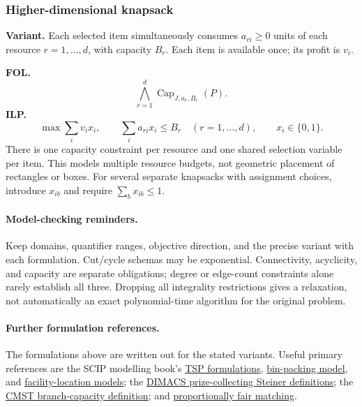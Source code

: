 \subsubsection{Higher-dimensional knapsack}\label{form:multiknapsack}
\textbf{Variant.} Each selected item simultaneously consumes $a_{ri}\ge0$
units of each resource $r=1,\ldots,d$, with capacity $B_r$. Each item is
available once; its profit is $v_i$.

\textbf{FOL.}
\[
 \bigwedge_{r=1}^d\operatorname{Cap}_{J,a_r,B_r}(P).
\]
\textbf{ILP.}
\[
 \max\sum_i v_ix_i,\qquad
 \sum_i a_{ri}x_i\le B_r\quad(r=1,\ldots,d),
 \qquad x_i\in\{0,1\}.
\]
There is one capacity constraint per resource and one shared selection
variable per item. This models multiple resource budgets, not geometric
placement of rectangles or boxes. For several separate knapsacks with
assignment choices, introduce $x_{ib}$ and require $\sum_bx_{ib}\le1$.

\paragraph{Model-checking reminders.}
Keep domains, quantifier ranges, objective direction, and the precise
variant with each formulation. Cut/cycle schemas may be exponential.
Connectivity, acyclicity, and capacity are separate obligations; degree or
edge-count constraints alone rarely establish all three. Dropping all
integrality restrictions gives a relaxation, not automatically an exact
polynomial-time algorithm for the original problem.

\paragraph{Further formulation references.}
The formulations above are written out for the stated variants. Useful
primary references are the SCIP modelling book's
\href{https://scipbook.readthedocs.io/en/latest/routing.html}{TSP formulations},
\href{https://github.com/joaopedroso/scipbook/blob/master/docs/bpp.rst}{bin-packing model},
and \href{https://scipbook.readthedocs.io/en/latest/flp.html}{facility-location models};
the \href{https://dimacs11.zib.de/downloads.html}{DIMACS prize-collecting Steiner definitions};
the \href{https://optimization-online.org/wp-content/uploads/2006/05/1404.pdf}{CMST branch-capacity definition};
and \href{https://arxiv.org/abs/2301.03862}{proportionally fair matching}.

